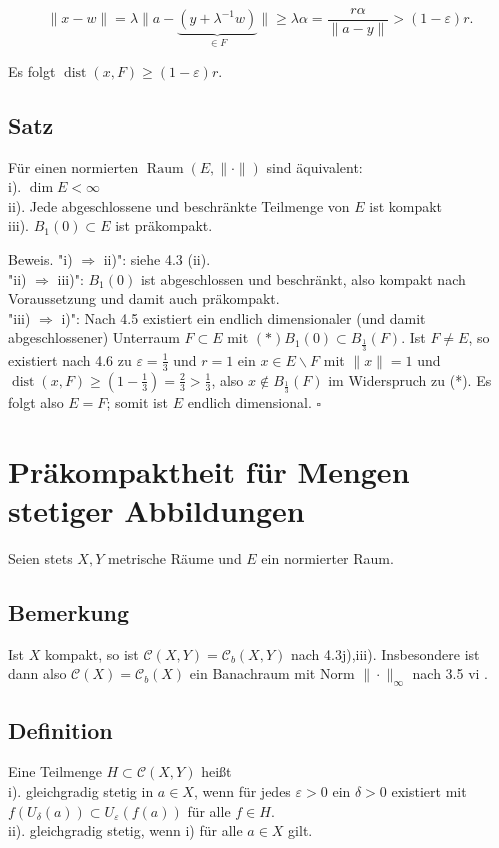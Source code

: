 \documentclass[10pt, letterpaper]{article}
\begin{document}
$$
\|x-w\|=\lambda\|a-\underbrace{\left(y+\lambda^{-1} w\right)}_{\in F}\| \geq \lambda \alpha=\frac{r \alpha}{\|a-y\|}>(1-\varepsilon) r .
$$

Es folgt $\operatorname{dist}(x, F) \geq(1-\varepsilon) r$.

\subsection*{Satz}
Für einen normierten $\operatorname{Raum}(E,\|\cdot\|)$ sind äquivalent:\\
i). $\operatorname{dim} E<\infty$\\
ii). Jede abgeschlossene und beschränkte Teilmenge von $E$ ist kompakt\\
iii). $B_{1}(0) \subset E$ ist präkompakt.

Beweis. "i) $\Longrightarrow$ ii)": siehe 4.3 (ii).\\
"ii) $\Longrightarrow$ iii)": $B_{1}(0)$ ist abgeschlossen und beschränkt, also kompakt nach Voraussetzung und damit auch präkompakt.\\
"iii) $\Longrightarrow$ i)": Nach 4.5 existiert ein endlich dimensionaler (und damit abgeschlossener) Unterraum $F \subset E$ mit $(*) B_{1}(0) \subset B_{\frac{1}{3}}(F)$. Ist $F \neq E$, so existiert nach 4.6 zu $\varepsilon=\frac{1}{3}$ und $r=1$ ein $x \in E \backslash F$ mit $\|x\|=1$ und $\operatorname{dist}(x, F) \geq\left(1-\frac{1}{3}\right)=\frac{2}{3}>\frac{1}{3}$, also $x \notin B_{\frac{1}{3}}(F)$ im Widerspruch zu (*). Es folgt also $E=F$; somit ist $E$ endlich dimensional. \(\square\)

\section*{Präkompaktheit für Mengen stetiger Abbildungen}
Seien stets $X, Y$ metrische Räume und $E$ ein normierter Raum.

\subsection*{Bemerkung}
Ist $X$ kompakt, so ist $\mathcal{C}(X, Y)=\mathcal{C}_{b}(X, Y)$ nach 4.3j),iii). Insbesondere ist dann also $\mathcal{C}(X)=\mathcal{C}_{b}(X)$ ein Banachraum mit Norm $\|\cdot\|_{\infty}$ nach 3.5 vi .

\subsection*{Definition}
Eine Teilmenge $H \subset \mathcal{C}(X, Y)$ heißt\\
i). gleichgradig stetig in $a \in X$, wenn für jedes $\varepsilon>0$ ein $\delta>0$ existiert mit $f\left(U_{\delta}(a)\right) \subset U_{\varepsilon}(f(a))$ für alle $f \in H$.\\
ii). gleichgradig stetig, wenn i) für alle $a \in X$ gilt.
\end{document}
